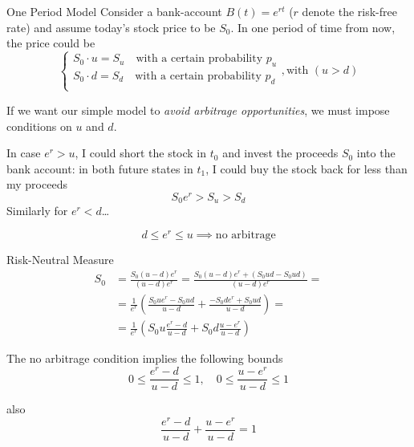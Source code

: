 \documentclass{beamer}
\begin{document}
\begin{frame}{One Period Model}
Consider a bank-account $B(t)=e^{rt}$ ($r$ denote the risk-free rate) and assume today's stock price to be $S_0$. In one period of time from now, the price could be 
\begin{equation*}
	\begin{cases}
		S_0\cdot u = S_u \quad\text{with a certain probability $p_u$} \\
		S_0\cdot d = S_d \quad\text{with a certain probability $p_d$}\\ 
	\end{cases}, \text{with }(u > d)
\end{equation*}

If we want our simple model to \emph{avoid arbitrage opportunities}, we must impose conditions on $u$ and $d$. 

In case $e^r > u$, I could short the stock in $t_0$ and invest the proceeds $S_0$ into the bank account: in both future states in $t_1$, I could buy the stock back for less than my proceeds 
\begin{equation*}
S_0e^r > S_u > S_d
\end{equation*} Similarly for $e^r < d$\ldots

\begin{equation*}
	\boxed{d\le e^r \le u \implies \text{no arbitrage}}
\end{equation*}
\end{frame}

\begin{frame}{Risk-Neutral Measure}
	\begin{equation*}
		\begin{aligned}
			S_0 &= \frac{S_0(u-d)e^r}{(u-d)e^r} = \frac{S_0(u-d)e^r + (S_0ud - S_0ud)}{(u-d)e^r}=\\
			&= \frac{1}{e^r}\left(\frac{S_0ue^r - S_0ud}{u-d} + \frac{-S_0de^r + S_0ud}{u-d}\right)=\\
			&= \frac{1}{e^r}\left(S_0u\frac{e^r - d}{u-d} + S_0d\frac{u - e^r}{u-d}\right)
		\end{aligned}
	\end{equation*}

	The no arbitrage condition implies the following bounds
	\begin{equation*}
		\boxed{0\le\frac{e^r -d}{u-d}\le 1,\quad 0\le\frac{u - e^r}{u-d}\le 1}
	\end{equation*}

	also
	\begin{equation}
		\boxed{\frac{e^r -d}{u-d} + \frac{u - e^r}{u-d} = 1}
	\label{eq:risk_neutral_probabilities}
	\end{equation}
\end{frame}
\end{document}

